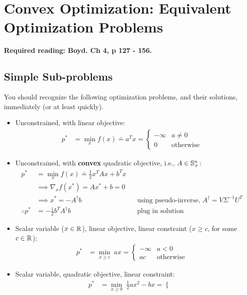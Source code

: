 \documentclass[12pt]{article}
\begin{document}
\pagebreak
\section{Convex Optimization: Equivalent Optimization Problems}

\textbf{Required reading: Boyd. Ch 4, p 127 - 156.}


\subsection{Simple Sub-problems}

You should recognize the following optimization problems, and their solutions, immediately (or at least quickly).

\begin{itemize}
\item Unconstrained, with linear objective:
%
\begin{align*}
p^* &= \min_{x} f(x) \doteq a^T x = \left\{ \begin{array}{ll}
-\infty & a \neq 0 \\
0 & \text{otherwise}
\end{array}\right.
\end{align*}
\item Unconstrained, with \textbf{convex} quadratic objective, i.e., $A \in { {\mathbb S}_{+}^{n} }$:
%
\begin{align*}
p^* &= \min_{x} f(x) \doteq \frac{1}{2} x^T A x + b^T x \\
& \implies \nabla_x f (x^*) = Ax^* + b = 0 \\
& \implies x^* = - A^{\dagger} b &&\text{using pseudo-inverse, } A^{\dagger} = V \Sigma^{-1} U^T \\
\therefore p^* & = -\frac{1}{2} b^T A^{\dagger} b && \text{plug in solution}
\end{align*}
\item Scalar variable ($x \in { {\mathbb R}^{} }$), linear objective, linear constraint ($x \geq c$, for some $c \in { {\mathbb R}^{} }$):
%
\begin{align*}
p^* &= \min_{x \geq c} \; a x = \left\{ \begin{array}{ll}
- \infty & a < 0 \\
ac & \text{otherwise}
\end{array}\right.
\end{align*}
\item Scalar variable, quadratic objective, linear constraint:
%
\begin{align*}
p^* &= \min_{x \geq 0} \;  \frac{1}{2}ax^2 - bx = \left\{ \begin{array}{ll}

\end{array}
\end{align*}
\end{itemize}
\end{document}
